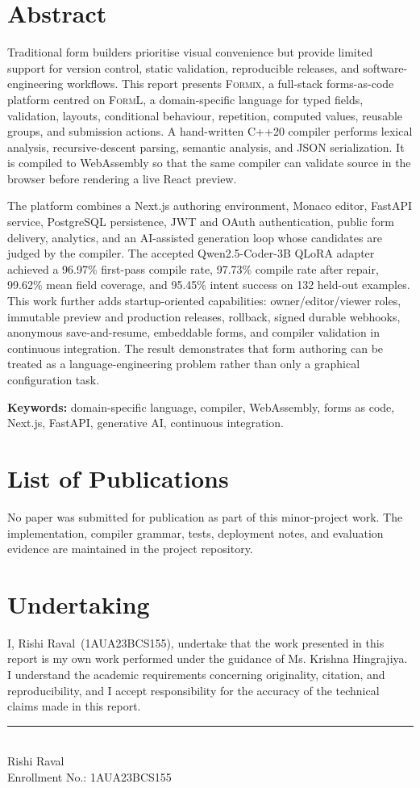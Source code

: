 \documentclass[12pt,a4paper,oneside]{report}
\newcommand{\formix}{\textsc{Formix}}
\newcommand{\forml}{\textsc{FormL}}
\newcommand{\student}{Rishi Raval}
\newcommand{\enrolment}{1AUA23BCS155}
\newcommand{\guide}{Ms. Krishna Hingrajiya}
\newcommand{\signatureline}[1]{\par\vspace{13mm}\noindent\rule{60mm}{0.4pt}\\#1}
\begin{document}
\chapter*{Abstract}
Traditional form builders prioritise visual convenience but provide limited support for
version control, static validation, reproducible releases, and software-engineering workflows.
This report presents \formix, a full-stack forms-as-code platform centred on \forml, a
domain-specific language for typed fields, validation, layouts, conditional behaviour,
repetition, computed values, reusable groups, and submission actions. A hand-written C++20
compiler performs lexical analysis, recursive-descent parsing, semantic analysis, and JSON
serialization. It is compiled to WebAssembly so that the same compiler can validate source in
the browser before rendering a live React preview.

The platform combines a Next.js authoring environment, Monaco editor, FastAPI service,
PostgreSQL persistence, JWT and OAuth authentication, public form delivery, analytics, and an
AI-assisted generation loop whose candidates are judged by the compiler. The accepted
Qwen2.5-Coder-3B QLoRA adapter achieved a 96.97\% first-pass compile rate, 97.73\% compile
rate after repair, 99.62\% mean field coverage, and 95.45\% intent success on 132 held-out
examples. This work further adds startup-oriented capabilities: owner/editor/viewer roles,
immutable preview and production releases, rollback, signed durable webhooks, anonymous
save-and-resume, embeddable forms, and compiler validation in continuous integration. The
result demonstrates that form authoring can be treated as a language-engineering problem
rather than only a graphical configuration task.

\noindent\textbf{Keywords:} domain-specific language, compiler, WebAssembly, forms as code,
Next.js, FastAPI, generative AI, continuous integration.

\chapter*{List of Publications}
No paper was submitted for publication as part of this minor-project work. The implementation,
compiler grammar, tests, deployment notes, and evaluation evidence are maintained in the
project repository.

\chapter*{Undertaking}
I, \student\ (\enrolment), undertake that the work presented in this report is my own work
performed under the guidance of \guide. I understand the academic requirements concerning
originality, citation, and reproducibility, and I accept responsibility for the accuracy of the
technical claims made in this report.
\signatureline{\student\\Enrollment No.: \enrolment}
\end{document}
